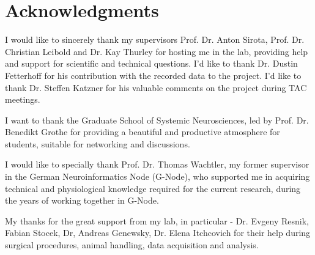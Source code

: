 \documentclass[twoside, 12pt,  footinclude=true, headinclude=true, cleardoublepage=empty]{scrbook}
\begin{document}


\frontmatter

\chapter{Acknowledgments}

\begingroup
\setlength{\parskip}{1em}

I would like to sincerely thank my supervisors Prof. Dr. Anton Sirota, Prof. Dr. Christian Leibold and Dr. Kay Thurley for hosting me in the lab, providing help and support for scientific and technical questions. I'd like to thank Dr. Dustin Fetterhoff for his contribution with the recorded data to the project. I'd like to thank Dr. Steffen Katzner for his valuable comments on the project during TAC meetings.

I want to thank the Graduate School of Systemic Neurosciences, led by Prof. Dr. Benedikt Grothe for providing a beautiful and productive atmosphere for students, suitable for networking and discussions.

I would like to specially thank Prof. Dr. Thomas Wachtler, my former supervisor in the German Neuroinformatics Node (G-Node), who supported me in acquiring technical and physiological knowledge required for the current research, during the years of working together in G-Node.

My thanks for the great support from my lab, in particular - Dr. Evgeny Resnik, Fabian Stocek, Dr, Andreas Genewsky, Dr. Elena Itchcovich for their help during surgical procedures, animal handling, data acquisition and analysis.

\endgroup


\tableofcontents

\listoffigures




\mainmatter













\printbibliography

\backmatter


\end{document}
